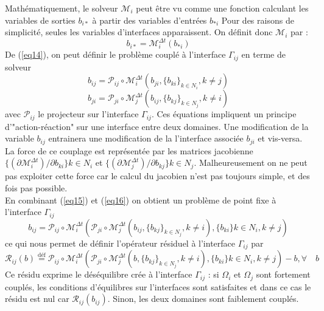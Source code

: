 \documentclass[11pt,a4paper]{scrartcl}%
\begin{document}
	Mathématiquement, le solveur $\mathcal{M}_i$ peut être vu comme une fonction calculant les variables de sorties $b_{i*}$ à partir des variables d'entrées $b_{*i}$ Pour des raisons de simplicité, seules les variables d'interfaces apparaissent. On définit donc $\mathcal{M}_i$ par :
	\begin{equation}\label{eq14}
	b_{i*} = \mathcal{M}_i^{\Delta t}(b_{*i})
	\end{equation}
	De (\ref{eq14}), on peut définir le problème couplé à l'interface $\Gamma_{ij}$ en terme de solveur
	\begin{equation}\label{eq15}
	b_{ij} = \mathcal{P}_{ij}\circ\mathcal{M}_i^{\Delta t}(b_{ji},\{b_{ki}\}_{k\in N_i}, k\neq j)
	\end{equation}
	\begin{equation}\label{eq16}
	b_{ji} = \mathcal{P}_{ji}\circ\mathcal{M}_j^{\Delta t}(b_{ij},\{b_{kj}\}_{k\in N_j}, k\neq i)
	\end{equation}
	avec $\mathcal{P}_{ij}$ le projecteur sur l'interface $\Gamma_{ij}$.  Ces équations impliquent un principe  d'"action-réaction" sur une interface entre deux domaines. Une modification de la variable $b_{ij}$ entrainera une modification de la l'interface associée $b_{ji}$ et vis-versa. La force de ce couplage est représentée par les matrices jacobienne $\{(\partial\mathcal{M}_i^{\Delta t})/\partial b_{ki}\}k\in N_i$ et $\{(\partial\mathcal{M}_j^{\Delta t})/\partial b_{kj}\}k\in N_j$. Malheureusement on ne peut pas exploiter cette force car le calcul du jacobien n'est pas toujours simple, et des fois pas possible.\\
	En combinant (\ref{eq15}) et (\ref{eq16}) on obtient un problème de point fixe à l'interface $\Gamma_{ij}$
	\begin{equation}
	b_{ij} = \mathcal{P}_{ij}\circ\mathcal{M}_i^{\Delta t}\left(\mathcal{P}_{ji}\circ\mathcal{M}_j^{\Delta t}(b_{ij},\{b_{kj}\}_{k\in N_j}, k\neq i), \{b_{ki}\}k\in N_i, k\neq j \right)
	\end{equation}
	ce qui nous permet de définir l'opérateur résiduel à l'interface $\Gamma_{ij}$ par
	\begin{equation}\label{eq17}
	\mathcal{R}_{ij}(b)  \overset{\text{déf}}{=}\mathcal{P}_{ij}\circ\mathcal{M}_i^{\Delta t}\left(\mathcal{P}_{ji}\circ\mathcal{M}_j^{\Delta t}(b,\{b_{kj}\}_{k\in N_j}, k\neq i), \{b_{ki}\}k\in N_i, k\neq j \right)-b, \forall\quad b
	\end{equation}
	Ce résidu exprime le déséquilibre crée à l'interface $\Gamma_{ij}$ : si $\Omega_i$ et $\Omega_j$ sont fortement couplés, les conditions d'équilibres sur l'interfaces sont satisfaites et dans ce cas le résidu est nul car $\mathcal{R}_{ij}(b_{ij})$. Sinon, les deux domaines sont faiblement couplés.
\end{document}
